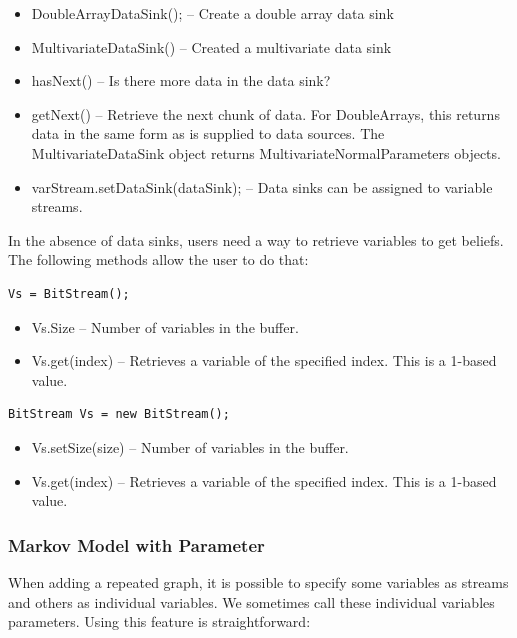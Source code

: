 \ifjava
\begin{itemize}
\item DoubleArrayDataSink(); -- Create a double array data sink
\item MultivariateDataSink() -- Created a multivariate data sink
\item hasNext() -- Is there more data in the data sink?
\item getNext() -- Retrieve the next chunk of data.  For DoubleArrays, this returns data in the same form as is supplied to data sources.  The MultivariateDataSink object returns MultivariateNormalParameters objects.
\item varStream.setDataSink(dataSink); -- Data sinks can be assigned to variable streams.
\end{itemize}
\fi

In the absence of data sinks, users need a way to retrieve variables to get beliefs.   The following methods allow the user to do that:

\ifmatlab
\begin{lstlisting}
Vs = BitStream();
\end{lstlisting}

\begin{itemize}
\item Vs.Size -- Number of variables in the buffer.
\item Vs.get(index) -- Retrieves a variable of the specified index.  This is a 1-based value.
\end{itemize}
\fi

\ifjava
\begin{lstlisting}
BitStream Vs = new BitStream();
\end{lstlisting}

\begin{itemize}
\item Vs.setSize(size) -- Number of variables in the buffer.
\item Vs.get(index) -- Retrieves a variable of the specified index.  This is a 1-based value.
\end{itemize}

\fi

\subsubsection{Markov Model with Parameter}


When adding a repeated graph, it is possible to specify some variables as streams and others as individual variables.  We sometimes call these individual variables parameters.  Using this feature is straightforward:

